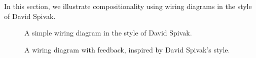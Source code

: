 
In this section, we illustrate compositionality using wiring diagrams in the style of David Spivak.

\begin{figure*}[t]
\centering

\caption{A simple wiring diagram in the style of David Spivak.}
\label{fig:wiring_diagram_1}
\end{figure*}

\begin{figure*}[t]
\centering

\caption{A wiring diagram with feedback, inspired by David Spivak's style.}
\label{fig:wiring_diagram_2}
\end{figure*}